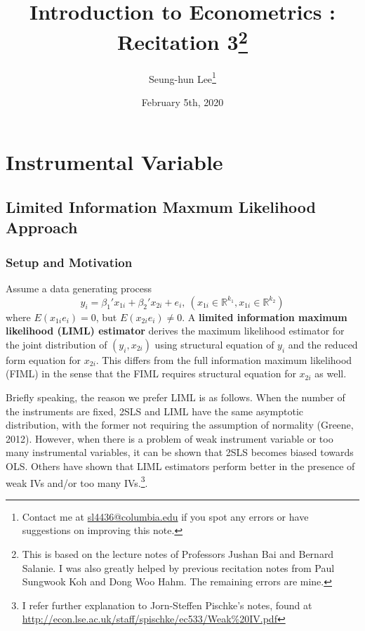 \documentclass[12pt]{article}
\title{Introduction to Econometrics \ROM{2}: Recitation 3\footnote{This is based on the lecture notes of Professors Jushan Bai and Bernard Salanie. I was also greatly helped by previous recitation notes from Paul Sungwook Koh and Dong Woo Hahm. The remaining errors are mine. }}
\theoremstyle{definition}
\theoremstyle{property}
\theoremstyle{assumption}
\theoremstyle{example}
\theoremstyle{comment}
\begin{document}
\linespread{1.25}
\onehalfspacing

\author{Seung-hun Lee\footnote{Contact me at \href{mailto:sl4436@columbia.edu}{sl4436@columbia.edu} if you spot any errors or have suggestions on improving this note.}}
\date{February 5th, 2020}
\maketitle
\thispagestyle{firstpage}

\section{Instrumental Variable}
\subsection{Limited Information Maxmum Likelihood Approach}
\subsubsection{Setup and Motivation}
Assume a data generating process
\[
y_ i = \beta_1' x_{1i}+ \beta_2' x_{2i}+e_i,\  (x_{1i}\in\mathbb{R}^{k_1}, x_{1i}\in\mathbb{R}^{k_2})
\]
where $E(x_{1i}e_i)=0$, but $E(x_{2i}e_i)\neq0$. A \textbf{limited information maximum likelihood (LIML) estimator} derives the maximum likelihood estimator for the joint distribution of $(y_i, x_{2i})$ using structural equation of $y_i$ and the reduced form equation for $x_{2i}$. This differs from the full information maximum likelihood (FIML) in the sense that the FIML requires structural equation for $x_{2i}$ as well. \par
Briefly speaking, the reason we prefer LIML is as follows. When the number of the instruments are fixed, 2SLS and LIML have the same asymptotic distribution, with the former not requiring the assumption of normality (Greene, 2012). However, when there is a problem of weak instrument variable or too many instrumental variables, it can be shown that 2SLS becomes biased towards OLS. Others have shown that LIML estimators perform better in the presence of weak IVs and/or too many IVs.\footnote{I refer further explanation to Jorn-Steffen Pischke's notes, found at \url{http://econ.lse.ac.uk/staff/spischke/ec533/Weak\%20IV.pdf}}. \par
\end{document}
